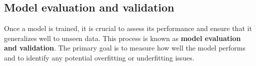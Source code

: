 







\subsection{Model evaluation and validation}

Once a model is trained, it is crucial to assess its performance and ensure that it generalizes well to unseen data. This process is known as \textbf{model evaluation and validation}. The primary goal is to measure how well the model performs and to identify any potential overfitting or underfitting issues.

